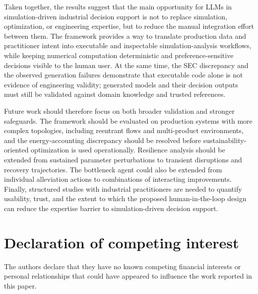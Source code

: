 \documentclass[a4paper,fleqn]{cas-sc}
\begin{document}
    Taken together, the results suggest that the main opportunity for LLMs in simulation-driven industrial decision support is not to replace simulation, optimization, or engineering expertise, but to reduce the manual integration effort between them. The framework provides a way to translate production data and practitioner intent into executable and inspectable simulation-analysis workflows, while keeping numerical computation deterministic and preference-sensitive decisions visible to the human user. At the same time, the SEC discrepancy and the observed generation failures demonstrate that executable code alone is not evidence of engineering validity; generated models and their decision outputs must still be validated against domain knowledge and trusted references.

    Future work should therefore focus on both broader validation and stronger safeguards. The framework should be evaluated on production systems with more complex topologies, including reentrant flows and multi-product environments, and the energy-accounting discrepancy should be resolved before sustainability-oriented optimization is used operationally. Resilience analysis should be extended from sustained parameter perturbations to transient disruptions and recovery trajectories. The bottleneck agent could also be extended from individual alleviation actions to combinations of interacting improvements. Finally, structured studies with industrial practitioners are needed to quantify usability, trust, and the extent to which the proposed human-in-the-loop design can reduce the expertise barrier to simulation-driven decision support.

  \section*{Declaration of competing interest}                                                                          
  The authors declare that they have no known competing financial interests or personal relationships that could have   
  appeared to influence the work reported in this paper.                                                                
                                                                                                                        
\end{document}
